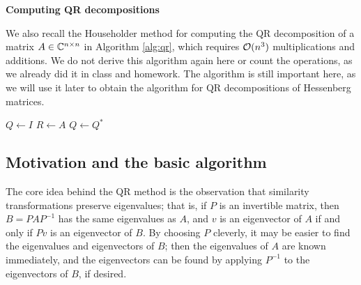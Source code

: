 \documentclass{article}
\begin{document}
\textbf{Computing QR decompositions}

We also recall the Householder method for computing the QR decomposition of a matrix $A \in \mathbb{C}^{n\times n}$ in Algorithm \ref{alg:qr}, which requires $\mathcal{O}(n^3)$ multiplications and additions. We do not derive this algorithm again here or count the operations, as we already did it in class and homework. The algorithm is still important here, as we will use it later to obtain the algorithm for QR decompositions of Hessenberg matrices.

\begin{algorithm}
	\caption{QR Decomposition with Householder Reflectors}
	\label{alg:qr}
	$Q \gets I$
	$R \gets A$\;
	$Q \gets Q^*$
\end{algorithm}

\subsection{Motivation and the basic algorithm}

The core idea behind the QR method is the observation that similarity transformations preserve eigenvalues; that is, if $P$ is an invertible matrix, then $B= PAP^{-1}$ has the same eigenvalues as $A$, and $v$ is an eigenvector of $A$ if and only if $Pv$ is an eigenvector of $B$. By choosing $P$ cleverly, it may be easier to find the eigenvalues and eigenvectors of $B$; then the eigenvalues of $A$ are known immediately, and the eigenvectors can be found by applying $P^{-1}$ to the eigenvectors of $B$, if desired.
\end{document}
